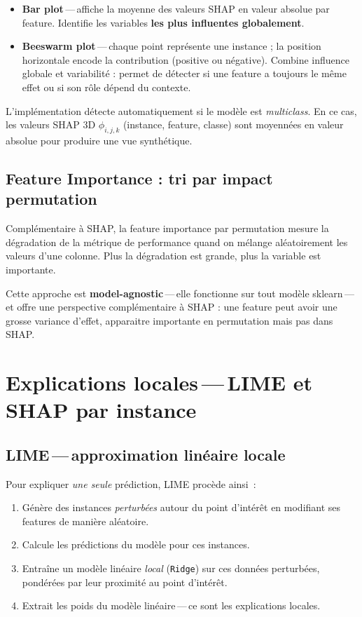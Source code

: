 \documentclass[11pt,a4paper]{report}
\begin{document}
\begin{itemize}
    \item \textbf{Bar plot}\,---\,affiche la moyenne des valeurs SHAP
        en valeur absolue par feature. Identifie les variables
        \textbf{les plus influentes globalement}.
    \item \textbf{Beeswarm plot}\,---\,chaque point repr\'esente une
        instance ; la position horizontale encode la contribution
        (positive ou n\'egative). Combine influence globale et
        variabilit\'e : permet de d\'etecter si une feature a toujours
        le m\^eme effet ou si son r\^ole d\'epend du contexte.
\end{itemize}

L'impl\'ementation d\'etecte automatiquement si le mod\`ele est
\textit{multiclass}. En ce cas, les valeurs SHAP 3D
$\phi_{i,j,k}$ (instance, feature, classe) sont moyenn\'ees en valeur
absolue pour produire une vue synth\'etique.

\subsection{Feature Importance : tri par impact permutation}

Compl\'ementaire \`a SHAP, la feature importance par permutation
mesure la d\'egradation de la m\'etrique de performance quand on
m\'elange al\'eatoirement les valeurs d'une colonne. Plus la
d\'egradation est grande, plus la variable est importante.

Cette approche est \textbf{model-agnostic}\,---\,elle fonctionne sur
tout mod\`ele sklearn\,---\,et offre une perspective compl\'ementaire
\`a SHAP : une feature peut avoir une grosse variance d'effet,
apparaitre importante en permutation mais pas dans SHAP.

\section{Explications locales\,---\,LIME et SHAP par instance}

\subsection{LIME\,---\,approximation lin\'eaire locale}

Pour expliquer \textit{une seule} pr\'ediction, LIME proc\`ede ainsi~:

\begin{enumerate}
    \item G\'en\`ere des instances \textit{perturb\'ees} autour du point
        d'int\'er\^et en modifiant ses features de mani\`ere al\'eatoire.
    \item Calcule les pr\'edictions du mod\`ele pour ces instances.
    \item Entra\^ine un mod\`ele lin\'eaire \textit{local} (\texttt{Ridge})
        sur ces donn\'ees perturb\'ees, pond\'er\'ees par leur proximit\'e
        au point d'int\'er\^et.
    \item Extrait les poids du mod\`ele lin\'eaire\,---\,ce sont les
        explications locales.
\end{enumerate}
\end{document}
